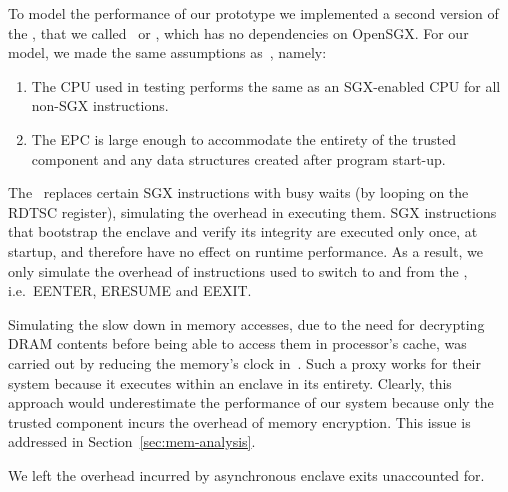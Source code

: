 \documentclass[../../../main.tex]{subfiles}
\begin{document}
\label{sec:perfmodel}
To model the performance of our prototype we implemented a second version of
the \enclaveprogram, that we called \busywait~or \enclavemodel, which
has no dependencies on OpenSGX. For our model, we made the same assumptions
as~\cite{Baumann14}, namely:
\begin{enumerate}
  \item The CPU used in testing performs the same as an SGX-enabled CPU for
    all non-SGX instructions.
  \item The EPC is large enough to accommodate the entirety of the trusted
    component and any data structures created after program start-up.
\end{enumerate}

The \busywait~replaces certain SGX instructions with busy waits (by looping on
the RDTSC register), simulating the overhead in executing them. SGX
instructions that bootstrap the enclave and verify its integrity are executed
only once, at startup, and therefore have no effect on runtime performance. As
a result, we only simulate the overhead of instructions used to switch to and
from the \enclaveprogram, i.e.\ EENTER, ERESUME and EEXIT.

Simulating the slow down in memory accesses, due to the need for decrypting
DRAM contents before being able to access them in processor's cache, was
carried out by reducing the memory's clock in~\cite{Baumann14}. Such a proxy
works for their system because it executes within an enclave in its entirety.
Clearly, this approach would underestimate the performance of our system
because only the trusted component incurs the overhead of memory encryption.
This issue is addressed in Section~\ref{sec:mem-analysis}.

We left the overhead incurred by asynchronous enclave exits unaccounted for.
\end{document}
